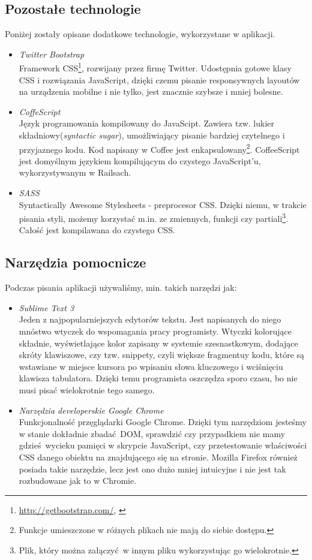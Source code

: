   \subsection{Pozostałe technologie}
    \label{other_technology}
    Poniżej zostały opisane dodatkowe technologie, wykorzystane w aplikacji.
    \begin{itemize}
      \item \emph{Twitter Bootstrap} \\ Framework CSS\footnote{\url{http://getbootstrap.com/}, \cite{bootstrap}}, rozwijany przez firmę Twitter. Udostępnia gotowe klasy CSS i rozwiązania JavaScript, dzięki czemu pisanie responsywnych layoutów na urządzenia mobilne i nie tylko, jest znacznie szybsze i mniej bolesne.
      \item \emph{CoffeScript} \\ Język programowania kompilowany do JavaScipt\cite{coffee}. Zawiera tzw. lukier składniowy(\emph{syntactic sugar}), umożliwiający pisanie bardziej czytelnego i przyjaznego kodu. Kod napisany w Coffee jest enkapsulowany\footnote{Funkcje umieszczone w różnych plikach nie mają do siebie dostępu.}. CoffeeScript jest domyślnym językiem kompilującym do czystego JavaScript'u, wykorzystywanym w Railsach.
      \item \emph{SASS} \\ Syntactically Awesome Stylesheets\cite{sass} - preprocesor CSS. Dzięki niemu, w trakcie pisania styli, możemy korzystać m.in. ze zmiennych, funkcji czy partiali\footnote{Plik, który można załączyć w innym pliku wykorzystując go wielokrotnie.}. Całość jest kompilawana do czystego CSS.
    \end{itemize}
  \subsection{Narzędzia pomocnicze}
    Podczas pisania aplikacji używaliśmy, min. takich narzędzi jak:
    \begin{itemize}
      \item \emph{Sublime Text 3} \\ Jeden z najpopularniejszych edytorów tekstu. Jest napisanych do niego mnóstwo wtyczek do wspomagania pracy programisty. Wtyczki kolorujące składnie, wyświetlające kolor zapisany w systemie szesnastkowym, dodające skróty klawiszowe, czy tzw. snippety, czyli większe fragmentuy kodu, które są wstawiane w miejsce kursora po wpisaniu słowa kluczowego i wciśnięciu klawisza tabulatora. Dzięki temu programista oszczędza sporo czasu, bo nie musi pisać wielokrotnie tego samego.
      \item \emph{Narzędzia developerskie Google Chrome} \\ Funkcjonalność przęglądarki Google Chrome. Dzięki tym narzędziom jesteśmy w stanie dokładnie zbadać DOM, sprawdzić czy przypadkiem nie mamy gdzieś wycieku pamięci w skrypcie JavaScript, czy przetestowanie właściwości CSS danego obiektu na znajdującego się na stronie. Mozilla Firefox również posiada takie narzędzie, lecz jest ono dużo mniej intuicyjne i nie jest tak rozbudowane jak to w Chromie.
    \end{itemize}
